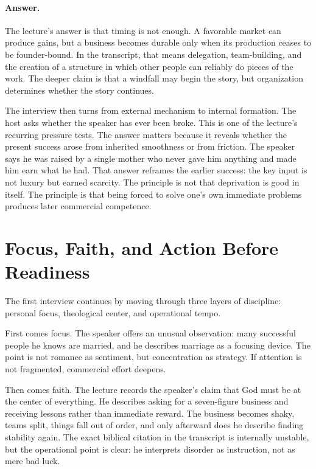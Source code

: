 \paragraph{Answer.} The lecture's answer is that timing is not enough. A favorable market can produce gains, but a business becomes durable only when its production ceases to be founder-bound. In the transcript, that means delegation, team-building, and the creation of a structure in which other people can reliably do pieces of the work. The deeper claim is that a windfall may begin the story, but organization determines whether the story continues.

The interview then turns from external mechanism to internal formation. The host asks whether the speaker has ever been broke. This is one of the lecture's recurring pressure tests. The answer matters because it reveals whether the present success arose from inherited smoothness or from friction. The speaker says he was raised by a single mother who never gave him anything and made him earn what he had. That answer reframes the earlier success: the key input is not luxury but earned scarcity. The principle is not that deprivation is good in itself. The principle is that being forced to solve one's own immediate problems produces later commercial competence.

\section{Focus, Faith, and Action Before Readiness}

The first interview continues by moving through three layers of discipline: personal focus, theological center, and operational tempo.

First comes focus. The speaker offers an unusual observation: many successful people he knows are married, and he describes marriage as a focusing device. The point is not romance as sentiment, but concentration as strategy. If attention is not fragmented, commercial effort deepens.

Then comes faith. The lecture records the speaker's claim that God must be at the center of everything. He describes asking for a seven-figure business and receiving lessons rather than immediate reward. The business becomes shaky, teams split, things fall out of order, and only afterward does he describe finding stability again. The exact biblical citation in the transcript is internally unstable, but the operational point is clear: he interprets disorder as instruction, not as mere bad luck.

